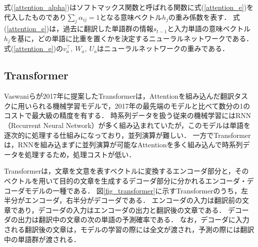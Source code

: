 \documentclass[12pt,a4j]{jreport}
\begin{document}
式(\ref{attention_alpha})はソフトマックス関数と呼ばれる関数に式(\ref{attention_e})を代入したものであり$\sum_j \alpha_{ij} = 1$となる意味ベクトル$h_j$の重み係数を表す．
式(\ref{attention_e})は，過去に翻訳した単語群の情報$s_{t-1}$と入力単語の意味ベクトル$h_j$を基に，どの単語に比重を置くかを決定するニューラルネットワークである．
式(\ref{attention_e})の$v_{a}^{\top},~ W_{a},~ U_{a}$はニューラルネットワークの重みである．

\subsection{Transformer}
Vaswaniらが2017年に提案したTransformerは，Attentionを組み込んだ翻訳タスクに用いられる機械学習モデルで，2017年の最先端のモデルと比べて数分の1のコストで最大級の精度を有する\cite{aurellen20}\cite{vaswani_attention_nodate}．
時系列データを扱う従来の機械学習にはRNN（Recurrent Neural Network）が多く組み込まれていたが，このモデルは単語を逐次的に処理する仕組みになっており，並列演算が難しい．
一方でTransformerは，RNNを組み込まずに並列演算が可能なAttentionを多く組み込んで時系列データを処理するため，処理コストが低い．

Transformerは，文章を文意を表すベクトルに変換するエンコーダ部分と，そのベクトルを用いて目的の文章を生成するデコーダ部分に分かれるエンコーダ・デコーダモデルの一種である．
図\ref{fig_transformer}に示すTransformerのうち，左半分がエンコーダ，右半分がデコーダである．
エンコーダの入力は翻訳前の文章であり，デコーダの入力はエンコーダの出力と翻訳後の文章である．
デコーダの出力は翻訳中の文章の次の単語の予測確率である．
なお，デコーダに入力される翻訳後の文章は，モデルの学習の際には全文が渡され，予測の際には翻訳中の単語群が渡される．
\end{document}
